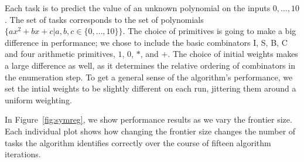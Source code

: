 \documentclass{article}
\newtheorem{definition}{Definition}
\begin{document}



Each task is to predict the value of an unknown polynomial on the
inputs $0, \dots, 10$. The set of tasks corresponds to the set of
polynomials $\{ax^2 + bx + c | a, b, c \in \{0, \dots, 10 \}\}$. The
choice of primitives is going to make a big difference in performance;
we chose to include the basic combinators I, S, B, C and four
arithmetic primitives, $1$, $0$, $*$, and $+$. The choice of initial
weights makes a large difference as well, as it determines the
relative ordering of combinators in the enumeration step. To get a
general sense of the algorithm's performance, we set the intial
weights to be slightly different on each run, jittering them around a
uniform weighting.

In Figure~\ref{fig:symreg}, we show performance results as we vary the
frontier size. Each individual plot shows how changing the frontier
size changes the number of tasks the algorithm identifies correctly
over the course of fifteen algorithm iterations. %
\end{document}
